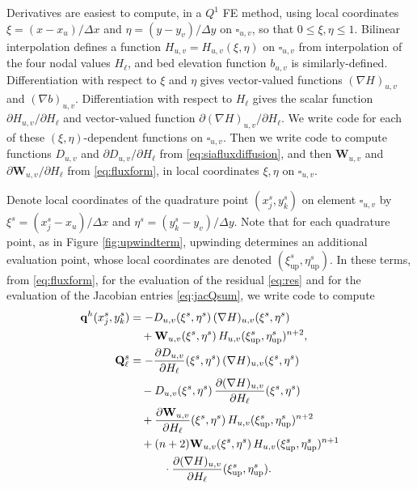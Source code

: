 \documentclass[twocolumn,letterpaper]{igs}
\newcommand\bq{\mathbf{q}}
\newcommand\bQ{\mathbf{Q}}
\newcommand\bW{\mathbf{W}}
\newcommand{\grad}{\nabla}
\begin{document}
\newcommand{\uppoint}{(\xi_{\text{up}}^s,\eta_{\text{up}}^s)}
Derivatives are easiest to compute, in a $Q^1$ FE method, using local coordinates $\xi=(x-x_u)/\Delta x$ and $\eta=(y-y_v)/\Delta y$ on $\square_{u,v}$, so that $0\le \xi,\eta \le 1$.  Bilinear interpolation defines a function $H_{u,v}=H_{u,v}(\xi,\eta)$ on $\square_{u,v}$ from interpolation of the four nodal values $H_\ell$, and bed elevation function $b_{u,v}$ is similarly-defined.  Differentiation with respect to $\xi$ and $\eta$ gives vector-valued functions $(\grad H)_{u,v}$ and $(\grad b)_{u,v}$.  Differentiation with respect to $H_\ell$ gives the scalar function $\partial H_{u,v}/\partial H_\ell$ and vector-valued function $\partial (\grad H)_{u,v}/\partial H_\ell$.  We write code for each of these $(\xi,\eta)$-dependent functions on $\square_{u,v}$.  Then we write code to compute functions $D_{u,v}$ and $\partial D_{u,v}/\partial H_\ell$ from \eqref{eq:siafluxdiffusion}, and then $\bW_{u,v}$ and $\partial \bW_{u,v}/\partial H_\ell$ from \eqref{eq:fluxform}, in local coordinates $\xi,\eta$ on $\square_{u,v}$.

Denote local coordinates of the quadrature point $(x_j^s,y_k^s)$ on element $\square_{u,v}$ by $\xi^s = (x_j^s-x_u)/\Delta x$ and $\eta^s = (y_k^s-y_v)/\Delta y$.  Note that for each quadrature point, as in Figure \ref{fig:upwindterm}, upwinding determines an additional evaluation point, whose local coordinates are denoted $\uppoint$.  In these terms, from \eqref{eq:fluxform}, for the evaluation of the residual \eqref{eq:res} and for the evaluation of the Jacobian entries \eqref{eq:jacQsum}, we write code to compute
\begin{align}
\bq^h(x_j^s,y_k^s) &= - D_{u,v}(\xi^s,\eta^s)\, (\grad H)_{u,v}(\xi^s,\eta^s) \label{eq:resfinalformula} \\
   &\quad + \bW_{u,v}(\xi^s,\eta^s) \, H_{u,v}\uppoint^{n+2}, \notag \\
\bQ_\ell^s &= - \frac{\partial D_{u,v}}{\partial H_\ell}(\xi^s,\eta^s)\, (\grad H)_{u,v}(\xi^s,\eta^s) \label{eq:jacfinalformula} \\
   &\quad - D_{u,v}(\xi^s,\eta^s)\, \frac{\partial (\grad H)_{u,v}}{\partial H_\ell}(\xi^s,\eta^s) \notag \\
   &\quad + \frac{\partial \bW_{u,v}}{\partial H_\ell}(\xi^s,\eta^s) \, H_{u,v}\uppoint^{n+2} \notag \\
   &\quad + (n+2) \bW_{u,v}(\xi^s,\eta^s)\, H_{u,v}\uppoint^{n+1} \notag \\
   &\qquad\quad \cdot \frac{\partial (\grad H)_{u,v}}{\partial H_\ell}\uppoint. \notag
\end{align}
\end{document}
